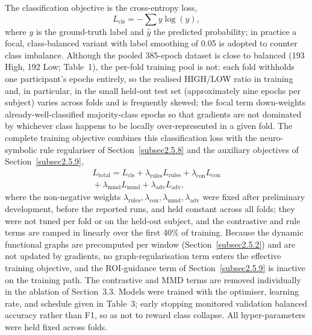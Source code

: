 \documentclass[pdflatex,sn-basic,Numbered]{sn-jnl}
\begin{document}
The classification objective is the cross-entropy loss,
\begin{equation}
L_{\mathrm{cls}} = -\sum y \log(\hat y), \label{eq25}
\end{equation}
where $y$ is the ground-truth label and $\hat y$ the predicted probability; in practice a focal, class-balanced variant \cite{ref48,ref49} with label smoothing of 0.05 is adopted to counter class imbalance. Although the pooled 385-epoch dataset is close to balanced (193 High, 192 Low; Table~1), the per-fold training pool is not: each fold withholds one participant's epochs entirely, so the realised HIGH/LOW ratio in training and, in particular, in the small held-out test set (approximately nine epochs per subject) varies across folds and is frequently skewed; the focal term down-weights already-well-classified majority-class epochs so that gradients are not dominated by whichever class happens to be locally over-represented in a given fold. The complete training objective combines this classification loss with the neuro-symbolic rule regulariser of Section~\ref{subsec2.5.8} and the auxiliary objectives of Section~\ref{subsec2.5.9},
\begin{multline}
L_{\mathrm{total}} = L_{\mathrm{cls}} + \lambda_{\mathrm{rules}} L_{\mathrm{rules}} + \lambda_{\mathrm{con}} L_{\mathrm{con}} \\
{} + \lambda_{\mathrm{mmd}} L_{\mathrm{mmd}} + \lambda_{\mathrm{adv}} L_{\mathrm{adv}}, \label{eq26}
\end{multline}
where the non-negative weights $\lambda_{\mathrm{rules}}, \lambda_{\mathrm{con}}, \lambda_{\mathrm{mmd}}, \lambda_{\mathrm{adv}}$ were fixed after preliminary development, before the reported runs, and held constant across all folds; they were not tuned per fold or on the held-out subject, and the contrastive and rule terms are ramped in linearly over the first 40\% of training. Because the dynamic functional graphs are precomputed per window (Section~\ref{subsec2.5.2}) and are not updated by gradients, no graph-regularisation term enters the effective training objective, and the ROI-guidance term of Section~\ref{subsec2.5.9} is inactive on the training path. The contrastive and MMD terms are removed individually in the ablation of Section~3.3. Models were trained with the optimiser, learning rate, and schedule given in Table~3; early stopping monitored validation balanced accuracy rather than F1, so as not to reward class collapse. All hyper-parameters were held fixed across folds.
\end{document}
